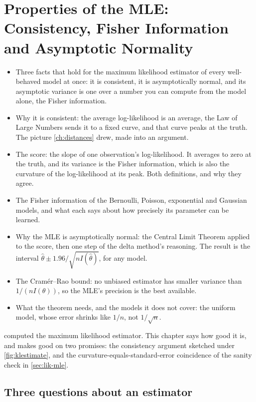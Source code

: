 \chapter[Properties of the MLE]{Properties of the MLE: Consistency, Fisher Information and Asymptotic Normality}
\label{ch:mle-properties}

\begin{chaptergoals}
\begin{itemize}[nosep]
\item Three facts that hold for the maximum likelihood estimator of every well-behaved model at once: it is consistent, it is asymptotically normal, and its asymptotic variance is one over a number you can compute from the model alone, the Fisher information.
\item Why it is consistent: the average log-likelihood is an average, the Law of Large Numbers sends it to a fixed curve, and that curve peaks at the truth. The picture \cref{ch:distances} drew, made into an argument.
\item The score: the slope of one observation's log-likelihood. It averages to zero at the truth, and its variance is the Fisher information, which is also the curvature of the log-likelihood at its peak. Both definitions, and why they agree.
\item The Fisher information of the Bernoulli, Poisson, exponential and Gaussian models, and what each says about how precisely its parameter can be learned.
\item Why the MLE is asymptotically normal: the Central Limit Theorem applied to the score, then one step of the delta method's reasoning. The result is the interval $\hat{\theta} \pm 1.96/\sqrt{nI(\hat{\theta})}$, for any model.
\item The Cram\'er--Rao bound: no unbiased estimator has smaller variance than $1/(nI(\theta))$, so the MLE's precision is the best available.
\item What the theorem needs, and the models it does not cover: the uniform model, whose error shrinks like $1/n$, not $1/\sqrt{n}$.
\end{itemize}
 computed the maximum likelihood estimator. This chapter says how good it is, and makes good on two promises: the consistency argument sketched under \cref{fig:klestimate}, and the curvature-equals-standard-error coincidence of the sanity check in \cref{sec:lik-mle}.
\end{chaptergoals}

\section{Three questions about an estimator}
\label{sec:mle-questions}


